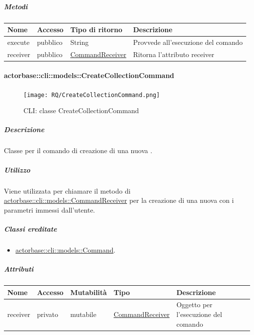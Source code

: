 \documentclass{scalatekids-article}
\begin{document}
\subparagraph{Metodi}

\begin{tabular}{| p{3cm} | p{1.5cm} | p{3.5cm} | p{9cm} |}
  \hline
  Nome & Accesso & Tipo di ritorno & Descrizione\\
  \hline
  execute & pubblico & String & Provvede all'esecuzione del comando\\
  \hline
  receiver & pubblico & \hyperref[sec:actorbase::cli::models::CommandReceiver]{CommandReceiver} & Ritorna l'attributo receiver\\
  \hline
\end{tabular}

\paragraph{actorbase::cli::models::CreateCollectionCommand}
\label{sec:actorbase::cli::models::CreateCollectionCommand}

\begin{figure}[H]
  \begin{center}
    \texttt{[image: RQ/CreateCollectionCommand.png]}
    \caption{CLI: classe CreateCollectionCommand}
  \end{center}
\end{figure}

\subparagraph{Descrizione}

Classe per il comando di creazione di una nuova .

\subparagraph{Utilizzo}

Viene utilizzata per chiamare il metodo di
\hyperref[sec:actorbase::cli::models::CommandReceiver]{actorbase::cli::models::CommandReceiver} per la creazione di una nuova
 con i parametri immessi dall'utente.

\subparagraph{Classi ereditate}

\begin{itemize}
\item \hyperref[sec:actorbase::cli::models::Command]{actorbase::cli::models::Command}.
\end{itemize}

\subparagraph{Attributi}

\begin{tabular}{| p{1cm} | p{1.5cm} | p{2cm} | p{4cm} | p{8.5cm} |}
  \hline
  Nome & Accesso & Mutabilità & Tipo & Descrizione\\
  \hline
  receiver & privato & mutabile & \hyperref[sec:actorbase::cli::models::CommandReceiver]{CommandReceiver} & Oggetto per l'esecuzione del comando\\
  \hline
\end{tabular}
\end{document}
